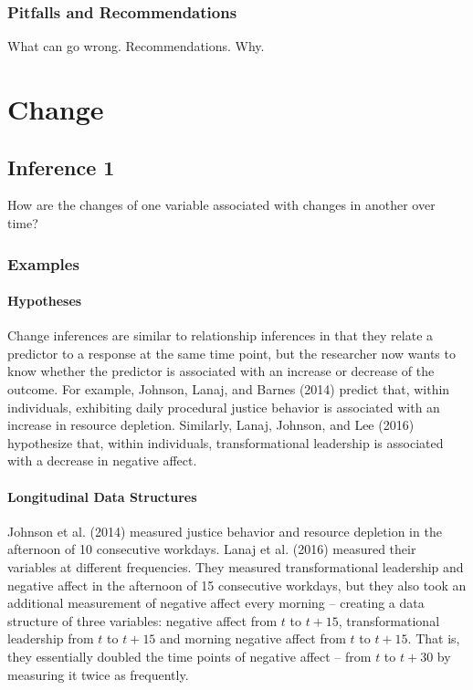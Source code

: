 \documentclass[english,,man]{apa6}
\let\oldparagraph\paragraph
\renewcommand{\paragraph}[1]{\oldparagraph{#1}\mbox{}}
\theoremstyle{definition}
\theoremstyle{definition}
\theoremstyle{definition}
\theoremstyle{remark}
\begin{document}
\hypertarget{pitfalls-and-recommendations-5}{%
\subsubsection{Pitfalls and
Recommendations}\label{pitfalls-and-recommendations-5}}

What can go wrong. Recommendations. Why.

\hypertarget{change}{%
\section{Change}\label{change}}

\hypertarget{inference-1-2}{%
\subsection{Inference 1}\label{inference-1-2}}

How are the changes of one variable associated with changes in another
over time?

\hypertarget{examples-6}{%
\subsubsection{Examples}\label{examples-6}}

\hypertarget{hypotheses-6}{%
\paragraph{Hypotheses}\label{hypotheses-6}}

Change inferences are similar to relationship inferences in that they
relate a predictor to a response at the same time point, but the
researcher now wants to know whether the predictor is associated with an
increase or decrease of the outcome. For example, Johnson, Lanaj, and
Barnes (2014) predict that, within individuals, exhibiting daily
procedural justice behavior is associated with an increase in resource
depletion. Similarly, Lanaj, Johnson, and Lee (2016) hypothesize that,
within individuals, transformational leadership is associated with a
decrease in negative affect.

\hypertarget{longitudinal-data-structures-1}{%
\paragraph{Longitudinal Data
Structures}\label{longitudinal-data-structures-1}}

Johnson et al. (2014) measured justice behavior and resource depletion
in the afternoon of 10 consecutive workdays. Lanaj et al. (2016)
measured their variables at different frequencies. They measured
transformational leadership and negative affect in the afternoon of 15
consecutive workdays, but they also took an additional measurement of
negative affect every morning -- creating a data structure of three
variables: negative affect from \(t\) to \(t + 15\), transformational
leadership from \(t\) to \(t + 15\) and morning negative affect from
\(t\) to \(t + 15\). That is, they essentially doubled the time points
of negative affect -- from \(t\) to \(t + 30\) by measuring it twice as
frequently.
\end{document}
